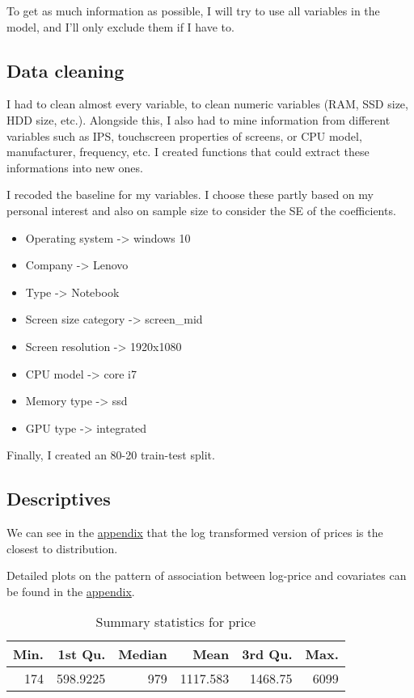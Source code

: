 \documentclass[
]{article}
\providecommand{\tightlist}{%
  \setlength{\itemsep}{0pt}\setlength{\parskip}{0pt}}
\begin{document}
To get as much information as possible, I will try to use all variables
in the model, and I'll only exclude them if I have to.

\hypertarget{data-cleaning}{%
\subsection{Data cleaning}\label{data-cleaning}}

I had to clean almost every variable, to clean numeric variables (RAM,
SSD size, HDD size, etc.). Alongside this, I also had to mine
information from different variables such as IPS, touchscreen properties
of screens, or CPU model, manufacturer, frequency, etc. I created
functions that could extract these informations into new ones.

I recoded the baseline for my variables. I choose these partly based on
my personal interest and also on sample size to consider the SE of the
coefficients.

\begin{itemize}
\tightlist
\item
  Operating system -\textgreater{} windows 10
\item
  Company -\textgreater{} Lenovo
\item
  Type -\textgreater{} Notebook
\item
  Screen size category -\textgreater{} screen\_mid
\item
  Screen resolution -\textgreater{} 1920x1080
\item
  CPU model -\textgreater{} core i7
\item
  Memory type -\textgreater{} ssd
\item
  GPU type -\textgreater{} integrated
\end{itemize}

Finally, I created an 80-20 train-test split.

\hypertarget{descriptives}{%
\subsection{Descriptives}\label{descriptives}}

We can see in the \protect\hyperlink{appendix}{appendix} that the log
transformed version of prices is the closest to distribution.

Detailed plots on the pattern of association between log-price and
covariates can be found in the \protect\hyperlink{appendix}{appendix}.

\begin{table}

\caption{\label{tab:unnamed-chunk-5}Summary statistics for price}
\centering
\begin{tabular}[t]{r|r|r|r|r|r}
\hline
Min. & 1st Qu. & Median & Mean & 3rd Qu. & Max.\\
\hline
174 & 598.9225 & 979 & 1117.583 & 1468.75 & 6099\\
\hline
\end{tabular}
\end{table}
\end{document}
